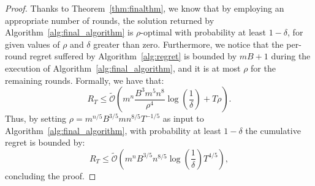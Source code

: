 \finalregret*

\begin{proof}
	Thanks to Theorem~\ref{thm:finalthm}, we know that by employing an appropriate number of rounds, the solution returned by Algorithm~\ref{alg:final_algorithm} is $\rho$-optimal with probability at least $1-\delta$, for given values of $\rho$ and $\delta$ greater than zero. Furthermore, we notice that the per-round regret suffered by Algorithm~\ref{alg:regret} is bounded by $mB+1$ during the execution of Algorithm~\ref{alg:final_algorithm}, and it is at most $\rho$ for the remaining rounds. Formally, we have that:
	\begin{equation*}
	R_T \le  \widetilde{\mathcal{O}}\left( m^n \frac{B^3 m^5 n^8}{\rho^4} \log \left(\frac{1}{\delta}\right)   + T \rho \right) .
	\end{equation*}
	Thus, by setting $\rho = m^{n/5} B^{3/5} m n^{8/5} T^{ - 1/5}$ as input to Algorithm~\ref{alg:final_algorithm}, with probability at least $1-\delta$ the cumulative regret is bounded by:
	\begin{equation*}
	R_T \le  \widetilde{\mathcal{O}}\left( m^n B^{3/5} n^{8/5} \log \left(\frac{1}{\delta}\right)  T^{4/5} \right),
	\end{equation*}
	concluding the proof.
\end{proof}

